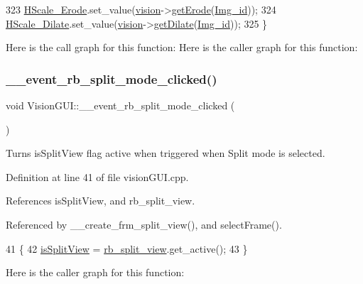 \begin{DoxyCode}
323     \hyperlink{class_vision_g_u_i_ad4bc77416f4e50fa03a7cc7f64a2d78e}{HScale\_Erode}.set\_value(\hyperlink{class_vision_g_u_i_a36aba058af844ec6cbe0c945c616cd5f}{vision}->\hyperlink{class_vision_a6cc4617b0af832b4cb94e00cc845c317}{getErode}(\hyperlink{class_vision_g_u_i_a4a46f114bc58e0f1d56b655f4bc8f9d8}{Img\_id}));
324     \hyperlink{class_vision_g_u_i_a6a7c757a11a2699e841b6b49fe18d1de}{HScale\_Dilate}.set\_value(\hyperlink{class_vision_g_u_i_a36aba058af844ec6cbe0c945c616cd5f}{vision}->\hyperlink{class_vision_a0d07157e3d9bb577940f03365c8f57e8}{getDilate}(\hyperlink{class_vision_g_u_i_a4a46f114bc58e0f1d56b655f4bc8f9d8}{Img\_id}));
325 \}
\end{DoxyCode}
Here is the call graph for this function\+:
Here is the caller graph for this function\+:
\mbox{\label{class_vision_g_u_i_a51c0888c14eb2b773e18d739df076e03}} 
\subsubsection{\texorpdfstring{\+\_\+\+\_\+event\+\_\+rb\+\_\+split\+\_\+mode\+\_\+clicked()}{\_\_event\_rb\_split\_mode\_clicked()}}
{\footnotesize\ttfamily void Vision\+G\+U\+I\+::\+\_\+\+\_\+event\+\_\+rb\+\_\+split\+\_\+mode\+\_\+clicked (\begin{DoxyParamCaption}{ }\end{DoxyParamCaption})\hspace{0.3cm}{\ttfamily [private]}}



Turns \textquotesingle{}is\+Split\+View\textquotesingle{} flag active when triggered when Split mode is selected. 



Definition at line 41 of file vision\+G\+U\+I.\+cpp.



References is\+Split\+View, and rb\+\_\+split\+\_\+view.



Referenced by \+\_\+\+\_\+create\+\_\+frm\+\_\+split\+\_\+view(), and select\+Frame().


\begin{DoxyCode}
41                                               \{
42     \hyperlink{class_vision_g_u_i_a7706a668c306ffcfbb12fbb16e05f478}{isSplitView} = \hyperlink{class_vision_g_u_i_a7fec73756125a9e179f91cde80658897}{rb\_split\_view}.get\_active();
43 \}
\end{DoxyCode}
Here is the caller graph for this function\+:
\mbox{\label{class_vision_g_u_i_a78a250ff8c2520a56dce79d824dbeb85}} 
